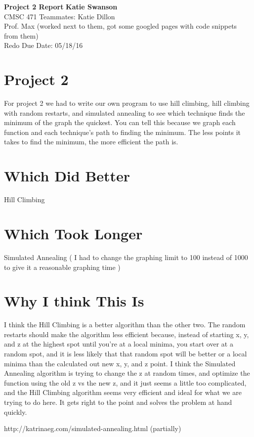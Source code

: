 \documentclass[a4paper, 11pt]{article}
\begin{document}
\noindent
\large\textbf{Project 2 Report} \hfill \textbf{Katie Swanson} \\
\normalsize CMSC 471 \hfill Teammates: Katie Dillon\\
Prof. Max \hfill (worked next to them, got some googled pages with code snippets from them) \\
 \hfill Redo Due Date: 05/18/16

\section*{Project 2}
For project 2 we had to write our own program to use hill climbing, hill climbing with random restarts, and simulated annealing to see which technique finds the minimum of the graph the quickest. You can tell this because we graph each function and each technique's path to finding the minimum. The less points it takes to find the minimum, the more efficient the path is.

\section*{Which Did Better}
Hill Climbing

\section*{Which Took Longer}
Simulated Annealing ( I had to change the graphing limit to 100 instead of 1000 to give it a reasonable graphing time )

\section*{Why I think This Is}
I think the Hill Climbing is a better algorithm than the other two. The random restarts should make the algorithm less efficient because, instead of starting x, y, and z at the highest spot until you're at a local minima, you start over at a random spot, and it is less likely that that random spot will be better or a local minima than the calculated out new x, y, and z point. I think the Simulated Annealing algorithm is trying to change the z at random times, and optimize the function using the old z vs the new z, and it just seems a little too complicated, and the Hill Climbing algorithm seems very efficient and ideal for what we are trying to do here. It gets right to the point and solves the problem at hand quickly.

\begin{thebibliography}{9}
http://katrinaeg.com/simulated-annealing.html (partially)
\end{thebibliography}
\end{document}
